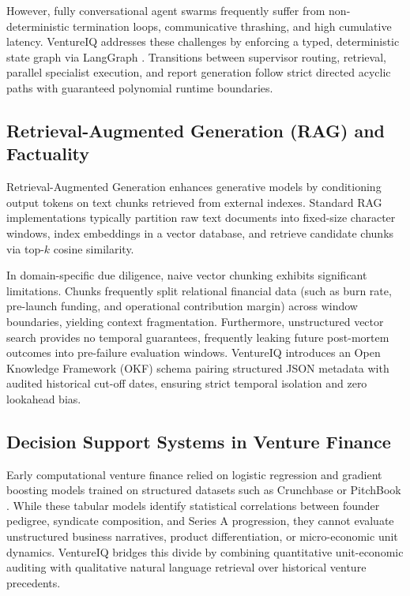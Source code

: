 \documentclass[conference]{IEEEtran}
\begin{document}
However, fully conversational agent swarms frequently suffer from non-deterministic termination loops, communicative thrashing, and high cumulative latency. VentureIQ addresses these challenges by enforcing a typed, deterministic state graph via LangGraph \cite{langgraph2024}. Transitions between supervisor routing, retrieval, parallel specialist execution, and report generation follow strict directed acyclic paths with guaranteed polynomial runtime boundaries.

\subsection{Retrieval-Augmented Generation (RAG) and Factuality}
Retrieval-Augmented Generation \cite{lewis2020} enhances generative models by conditioning output tokens on text chunks retrieved from external indexes. Standard RAG implementations typically partition raw text documents into fixed-size character windows, index embeddings in a vector database, and retrieve candidate chunks via top-$k$ cosine similarity. 

In domain-specific due diligence, naive vector chunking exhibits significant limitations. Chunks frequently split relational financial data (such as burn rate, pre-launch funding, and operational contribution margin) across window boundaries, yielding context fragmentation. Furthermore, unstructured vector search provides no temporal guarantees, frequently leaking future post-mortem outcomes into pre-failure evaluation windows. VentureIQ introduces an Open Knowledge Framework (OKF) schema pairing structured JSON metadata with audited historical cut-off dates, ensuring strict temporal isolation and zero lookahead bias.

\subsection{Decision Support Systems in Venture Finance}
Early computational venture finance relied on logistic regression and gradient boosting models trained on structured datasets such as Crunchbase or PitchBook \cite{arroyo2019}. While these tabular models identify statistical correlations between founder pedigree, syndicate composition, and Series A progression, they cannot evaluate unstructured business narratives, product differentiation, or micro-economic unit dynamics. VentureIQ bridges this divide by combining quantitative unit-economic auditing with qualitative natural language retrieval over historical venture precedents.
\end{document}
